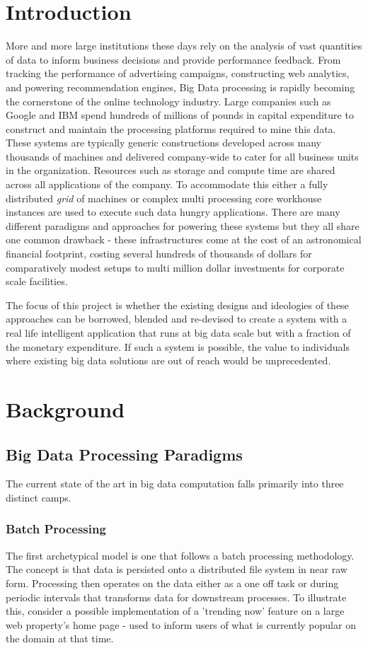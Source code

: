 \documentclass[a4paper,11pt]{scrreprt}
\begin{document}
\tableofcontents

\chapter{Introduction}
More and more large institutions these days rely on the analysis of vast quantities of data to inform business decisions and provide performance feedback. From tracking the performance of advertising campaigns, constructing web analytics, and powering recommendation engines, Big Data processing is rapidly becoming the cornerstone of the online technology industry. Large companies such as Google and IBM spend hundreds of millions of pounds in capital expenditure to construct and maintain the processing platforms required to mine this data. These systems are typically generic constructions developed across many thousands of machines and delivered company-wide to cater for all business units in the organization. Resources such as storage and compute time are shared across all applications of the company. To accommodate this either a fully distributed \textit{grid} of machines or complex multi processing core workhouse instances are used to execute such data hungry applications. There are many different paradigms and approaches for powering these systems but they all share one common drawback - these infrastructures come at the cost of an astronomical financial footprint, costing several hundreds of thousands of dollars for comparatively modest setups to multi million dollar investments for corporate scale facilities.

The focus of this project is whether the existing designs and ideologies of these approaches can be borrowed, blended and re-devised to create a system with a real life intelligent application that runs at big data scale but with a fraction of the monetary expenditure. If such a system is possible, the value to individuals where existing big data solutions are out of reach would be unprecedented.

\chapter{Background}
\section{Big Data Processing Paradigms}
The current state of the art in big data computation falls primarily into three distinct camps.
\subsection{Batch Processing}
The first archetypical model is one that follows a batch processing methodology. The concept is that data is persisted onto a distributed file system in near raw form. Processing then operates on the data either as a one off task or during periodic intervals that transforms data for downstream processes. To illustrate this, consider a possible implementation of a 'trending now' feature on a large web property's home page - used to inform users of what is currently popular on the domain at that time. 
\end{document}
